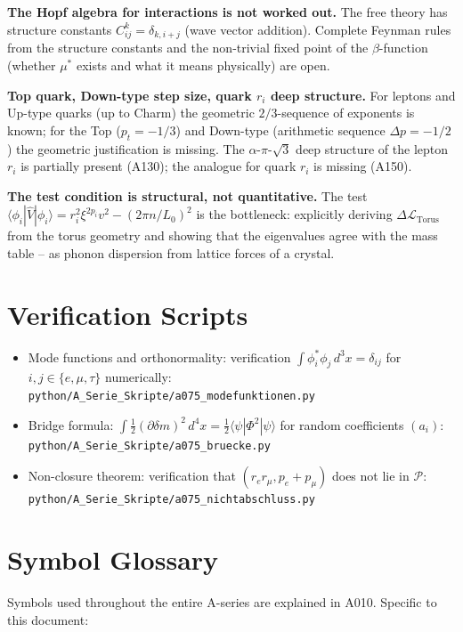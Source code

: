 \textbf{The Hopf algebra for interactions is not worked out.} The free theory
has structure constants $C_{ij}^k=\delta_{k,i+j}$ (wave vector addition).
Complete Feynman rules from the structure constants and the non-trivial fixed
point of the $\beta$-function (whether $\mu^*$ exists and what it means
physically) are open.

\textbf{Top quark, Down-type step size, quark $r_i$ deep structure.} For leptons
and Up-type quarks (up to Charm) the geometric $2/3$-sequence of exponents is
known; for the Top ($p_t=-1/3$) and Down-type (arithmetic sequence $\Delta p=-1/2$)
the geometric justification is missing. The $\alpha$-$\pi$-$\sqrt3$ deep
structure of the lepton $r_i$ is partially present (A130); the analogue for
quark $r_i$ is missing (A150).

\textbf{The test condition is structural, not quantitative.} The test
$\langle\phi_i|\hat V|\phi_i\rangle = r_i^2\xi^{2p_i}v^2-(2\pi n/L_0)^2$ is the
bottleneck: explicitly deriving $\Delta\mathcal L_\text{Torus}$ from the torus
geometry and showing that the eigenvalues agree with the mass table -- as phonon
dispersion from lattice forces of a crystal.

\section{Verification Scripts}

\begin{itemize}[leftmargin=2em,itemsep=2pt,topsep=2pt]
  \item Mode functions and orthonormality: verification
    $\int\phi_i^*\phi_j\,d^3x=\delta_{ij}$ for $i,j\in\{e,\mu,\tau\}$
    numerically:
    \texttt{python/A\_Serie\_Skripte/a075\_modefunktionen.py}
  \item Bridge formula: $\int\tfrac12(\partial\delta m)^2\,d^4x
    = \tfrac12\langle\psi|\Phi^2|\psi\rangle$ for random coefficients $(a_i)$:
    \texttt{python/A\_Serie\_Skripte/a075\_bruecke.py}
  \item Non-closure theorem: verification that $(r_e r_\mu, p_e+p_\mu)$
    does not lie in $\mathcal P$:
    \texttt{python/A\_Serie\_Skripte/a075\_nichtabschluss.py}
\end{itemize}

\section{Symbol Glossary}

Symbols used throughout the entire A-series are explained in A010.
Specific to this document:

